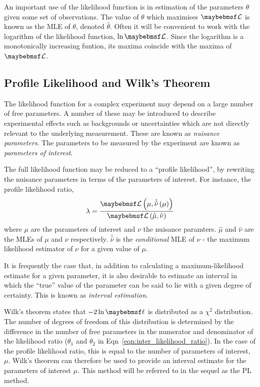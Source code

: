 An important use of the likelihood function is in estimation of the parameters
$\theta$ given some set of observations. The value of $\theta$ which maximises
$\likelihood$ is known as the \acl{MLE} of $\theta$, denoted
$\hat{\theta}$. Often it will be convenient to work with the logarithm of the
likelihood function, $\ln\likelihood$. Since the logarithm is a monotonically
increasing funtion, its maxima coincide with the maxima of $\likelihood$.


\subsection{Profile Likelihood and Wilk's Theorem}
\label{sec:inter_profile_likelihood}
The likelihood function for a complex experiment may depend on a large number of
free parameters. A number of these may be introduced to describe experimental
effects such as backgrounds or uncertainties which are not directly relevant to
the underlying measurement. These are known as \emph{nuisance parameters}. The
parameters to be measured by the experiment are known as \emph{parameters of
  interest}.

The full likelihood function may be reduced to a ``profile likelihood'', by
rewriting the nuisance parameters in terms of the parameters of interest. For
instance, the profile likelihood ratio,
\begin{equation}
  \lambda = \frac{\likelihood\left(\mu, \hat{\hat{\nu}}\left(\mu\right)\right)}{\likelihood\left(\hat{\mu}, \hat{\nu}\right)}
\end{equation}
where $\mu$ are the parameters of interest and $\nu$ the nuisance
paramters. $\hat{\mu}$ and $\hat{\nu}$ are the \acp{MLE} of $\mu$ and $\nu$
respectively. $\hat{\hat{\nu}}$ is the \emph{conditional} \ac{MLE} of $\nu$ -
the maximum likelihood estimator of $\nu$ for a given value of $\mu$.

It is frequently the case that, in addition to calculating a maximum-likelihood
estimate for a given parameter, it is also desirable to estimate an interval in
which the ``true'' value of the parameter can be said to lie with a given degree
of certainty. This is known as \emph{interval estimation}.

Wilk's theorem states that $-2\ln\likelihoodratio$ is distributed as a $\chi^2$
distribution. The number of degrees of freedom of this distribution is
determined by the difference in the number of free parameters in the numerator
and denominator of the likelihood ratio ($\theta_1$ and $\theta_2$ in
Eqn~\ref{eqn:inter_likelihood_ratio}). In the case of the profile likelihood
ratio, this is equal to the number of parameters of interest, $\mu$. Wilk's
theorem can therefore be used to provide an interval estimate for the parameters
of interest $\mu$. This method will be referred to in the sequel as the \ac{PL}
method.

